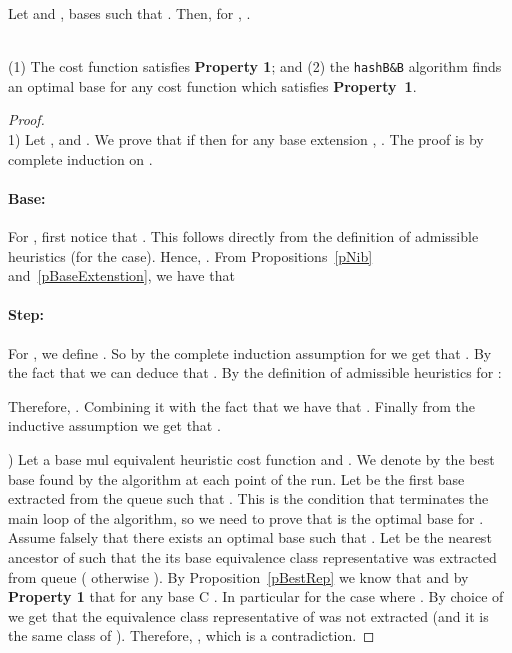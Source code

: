 \documentclass[envcountsame]{llncs}
\begin{document}
\begin{proposition}
\label{pBaseExtenstion}
Let  and , bases such that .
Then, for , .
\end{proposition}


\noindent{}\\
\noindent(1) The  cost function satisfies \textbf{Property 1}; and
(2)
the \texttt{hashB\&B} algorithm finds an optimal base for any cost
function which satisfies \textbf{Property~1}.



\begin{proof}~\\
  1) Let ,  and . We prove that if  then for any base extension , .  The proof is by complete induction on
  .

\paragraph{\bf Base:} 

For , first notice that . This follows
directly from the definition of admissible heuristics (for the
 case). Hence, .
From Propositions~\ref{pNib} and~\ref{pBaseExtenstion}, we have that
{\small
}

\paragraph{\bf Step:}  
For , we define . So
by
the complete
induction assumption for  we get that .  By the fact that  we
can deduce that . 
By the definition of  admissible heuristics for  :

Therefore, .  Combining it with the fact that  we
have that . Finally
from the inductive assumption we get that .

) Let  a base mul equivalent
heuristic cost function and .  We denote by 
the best base found by the algorithm at each point of the run.  Let
 be the first base extracted from the queue such that
.  This is the condition that
terminates the main loop of the algorithm, so we need to prove that
 is the optimal base for .
Assume falsely that there exists an optimal base  such
 that .  Let  be the nearest ancestor
 of  such that the its base equivalence class representative 
 was extracted from queue ( otherwise ).  By Proposition~\ref{pBestRep} we know that
  and by \textbf{Property 1} that
 for any base C .  In particular for the
 case where .  By choice of  we get that
 the equivalence class representative of  was not
 extracted (and it is the same class of ).  Therefore,
 , which is a
 contradiction.
\end{proof}
\end{document}
